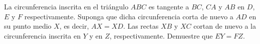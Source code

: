  La circunferencia inscrita en el triángulo $ABC$ es tangente a $BC$, $CA$ y $AB$ en $D$, $E$ y $F$ respectivamente.
Suponga que dicha circunferencia corta de nuevo a $AD$ en su punto medio $X$, es decir, $AX=XD$.
Las rectas $XB$ y $XC$ cortan de nuevo a la circunferencia inscrita en $Y$ y en $Z$, respectivamente.
Demuestre que $EY=FZ$.